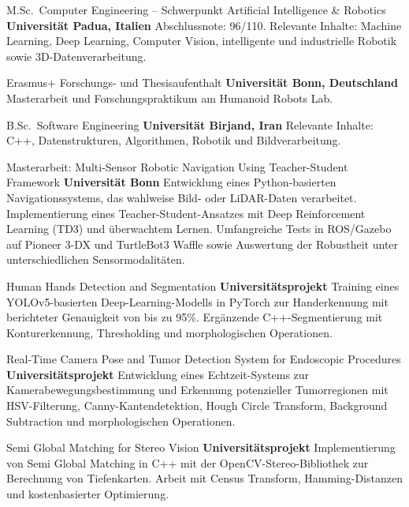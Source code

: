 \documentclass[
  a4paper, 
   maincolor=cvblue,
   sectioncolor=cvblue,
]{fortysecondscv}
\begin{document}
\begin{cvtable}
	{\color{cvsectioncolor}M.Sc.\ Computer Engineering -- Schwerpunkt Artificial Intelligence \& Robotics}
	{\textbf{Universität Padua, Italien}}
	{Abschlussnote: 96/110. Relevante Inhalte: Machine Learning, Deep Learning, Computer Vision, intelligente und industrielle Robotik sowie 3D-Datenverarbeitung.}

	{\color{cvsectioncolor}Erasmus+ Forschungs- und Thesisaufenthalt}
	{\textbf{Universität Bonn, Deutschland}}
	{Masterarbeit und Forschungspraktikum am Humanoid Robots Lab.}

	{\color{cvsectioncolor}B.Sc.\ Software Engineering}
	{\textbf{Universität Birjand, Iran}}
	{Relevante Inhalte: C++, Datenstrukturen, Algorithmen, Robotik und Bildverarbeitung.}
\end{cvtable}

\newpage
\makebacksidebar

\begin{cvtable}
	{\color{cvsectioncolor}Masterarbeit: Multi-Sensor Robotic Navigation Using Teacher-Student Framework}
	{\textbf{Universität Bonn}}
	{Entwicklung eines Python-basierten Navigationssystems, das wahlweise Bild- oder LiDAR-Daten verarbeitet. Implementierung eines Teacher-Student-Ansatzes mit Deep Reinforcement Learning (TD3) und überwachtem Lernen. Umfangreiche Tests in ROS/Gazebo auf Pioneer 3-DX und TurtleBot3 Waffle sowie Auswertung der Robustheit unter unterschiedlichen Sensormodalitäten.}

	{\color{cvsectioncolor}Human Hands Detection and Segmentation}
	{\textbf{Universitätsprojekt}}
	{Training eines YOLOv5-basierten Deep-Learning-Modells in PyTorch zur Handerkennung mit berichteter Genauigkeit von bis zu 95\%. Ergänzende C++-Segmentierung mit Konturerkennung, Thresholding und morphologischen Operationen.}

	{\color{cvsectioncolor}Real-Time Camera Pose and Tumor Detection System for Endoscopic Procedures}
	{\textbf{Universitätsprojekt}}
	{Entwicklung eines Echtzeit-Systems zur Kamerabewegungsbestimmung und Erkennung potenzieller Tumorregionen mit HSV-Filterung, Canny-Kantendetektion, Hough Circle Transform, Background Subtraction und morphologischen Operationen.}

	{\color{cvsectioncolor}Semi Global Matching for Stereo Vision}
	{\textbf{Universitätsprojekt}}
	{Implementierung von Semi Global Matching in C++ mit der OpenCV-Stereo-Bibliothek zur Berechnung von Tiefenkarten. Arbeit mit Census Transform, Hamming-Distanzen und kostenbasierter Optimierung.}
\end{cvtable}
\end{document}
